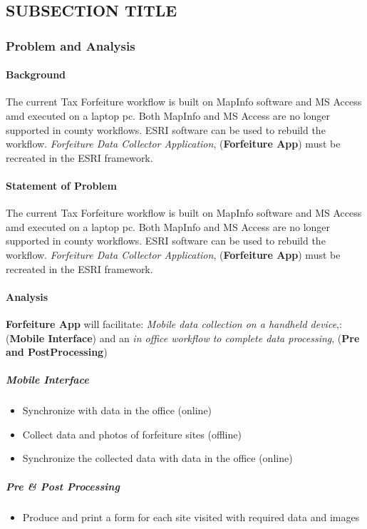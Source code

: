 \subsection{SUBSECTION TITLE}
\subsubsection{Problem and Analysis}
\begin{adjmulticols}{2}{\innerMar}{\outerMar}
\paragraph{Background}
\noindent The current Tax Forfeiture workflow is built on MapInfo software and MS Access amd executed on a laptop pc.  Both MapInfo and MS Access are no longer supported in county workflows.  ESRI software can be used to rebuild the workflow.  \textit{Forfeiture Data Collector Application}, (\textbf{Forfeiture App}) must be recreated in the ESRI framework.
\paragraph{Statement of Problem}
\noindent The current Tax Forfeiture workflow is built on MapInfo software and MS Access amd executed on a laptop pc.  Both MapInfo and MS Access are no longer supported in county workflows.  ESRI software can be used to rebuild the workflow.  \textit{Forfeiture Data Collector Application}, (\textbf{Forfeiture App}) must be recreated in the ESRI framework.
\paragraph{Analysis}
\noindent \textbf{Forfeiture App} will facilitate: \textit{Mobile data collection on a handheld device},: (\textbf{Mobile Interface}) and an
\textit{in office workflow to complete data processing}, (\textbf{Pre and PostProcessing})
\subparagraph*{Mobile Interface}
\begin{itemize} %
\item Synchronize with data in the office (online)
\item Collect data and photos of forfeiture sites (offline)
\item Synchronize the collected data with data in the office (online)
\end{itemize} %
\subparagraph*{Pre \& Post Processing}
\begin{itemize} %
\item Produce and print a form for each site visited with required data and images
\end{itemize} %
\end{adjmulticols}
\clearpage
